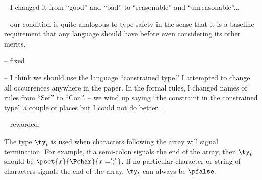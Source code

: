 


-- I changed it from ``good'' and ``bad'' to ``reasonable'' and
``unreasonable''...

-- our condition is quite analogous to type safety in the sense that it is a
baseline requirement that any language should have before even considering
its other merits.


-- fixed


-- I think we should use the language ``constrained type.''  I attempted
to change all occurrences anywhere in the paper.  In the formal rules, 
I changed names of rules from ``Set'' to ``Con''.
-- we wind up saying ``the constraint in the constrained 
type'' a couple of places but I could not do better...


-- reworded:

 The type 
$\ty_t$ is used when characters following the array will signal termination.
For example, if a semi-colon signals the end of the array, then $\ty_t$ 
should be $\pset{x}{\Pchar}{x = ';'}$. If no particular character or 
string of characters
signals the end of the array, $\ty_t$ can always be $\pfalse$.

